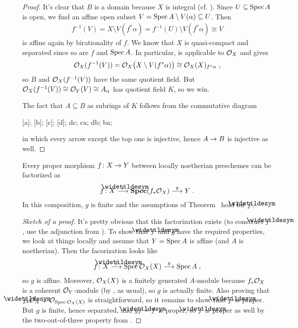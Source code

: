 \documentclass[a4paper,parskip=half,numbers=enddot, DIV=12]{scrreprt}
\begin{document}
\begin{proof}
	It's clear that $B$ is a domain because $X$ is integral (cf. \cite[Proposition~2.1.4]{alggeo1}). Since $U\subseteq \operatorname{Spec} A$ is open, we find an affine open subset $V=\operatorname{Spec} A\setminus V(\alpha)\subseteq U$. Then 
	\begin{align*}
		f^{-1}(V)=X\setminus V(f^*\alpha)=f^{-1}(U)\setminus V(f^*\alpha)\cong V
	\end{align*}
	is affine again by birationality of $f$. We know that $X$ is quasi-compact and separated since so are $f$ and $\operatorname{Spec} A$. In particular, \cite[Proposition~1.5.1]{alggeo1} is applicable to $\mathcal{O}_X$ and gives 
	\begin{align*}
		\mathcal{O}_X(f^{-1}(V))=\mathcal{O}_X\big(X\setminus V(f^*\alpha)\big)\cong\mathcal{O}_X(X)_{f^*\alpha}\;,
	\end{align*}
	so $B$ and $\mathcal{O}_X(f^{-1}(V))$ have the same quotient field. But $\mathcal{O}_X(f^{-1}(V))\cong \mathcal{O}_Y(V)\cong A_\alpha$ has quotient field $K$, so we win.
	
	The fact that $A\subseteq B$ as subrings of $K$ follows from the commutative diagram
	\begin{diagram*}
		[a];
		[b];
		[c];
		[d];
		\scriptsize
		\arrow dc;
		ca;
		db;
		\isoarrow ba;
	\end{diagram*}
	in which every arrow except the top one is injective, hence $A\morphism B$ is injective as well.
\end{proof}
\begin{fact}
	Every proper morphism $f\colon X\morphism Y$ between locally noetherian preschemes can be factorized as
	\begin{align*}
		f\colon X\morphism[\snake{f}]\SPEC(f_*\Oo_X)\morphism[g]Y\;.
	\end{align*}
	In this composition, $g$ is finite and the assumptions of Theorem~ hold for $\snake{f}$.
\end{fact}
\begin{proof}[Sketch of a proof]
	It's pretty obvious that this factorization exists (to construct $\snake{f}$, use the adjunction from \cite[Proposition~1.6.2]{alggeo2}). To show that $\snake{f}$ and $g$ have the required properties, we look at things locally and assume that $Y=\operatorname{Spec} A$ is affine (and $A$ is noetherian). Then the facorization looks like
	\begin{align*}
		f\colon X\morphism[\snake{f}]\Spec \Oo_X(X)\morphism[g]\Spec A\;,
	\end{align*}
	so $g$ is affine. Moreover, $\mathcal{O}_X(X)$ is a finitely generated $A$-module because $f_*\mathcal{O}_X$ is a coherent $\mathcal{O}_Y$-module (by \cite[Theorem~5]{alggeo2}, as usual), so $g$ is actually finite. Also proving that $\snake{f}_*\Oo_X=\Oo_{\Spec \Oo_X(X)}$ is straightforward, so it remains to show that $\snake{f}$ is proper. But $g$ is finite, hence separated, and $g\snake{f}=f$ is proper, so $\snake{f}$ is proper as well by the two-out-of-three property from \cite[Proposition~2.4.1]{alggeo2}.
\end{proof}
\end{document}
